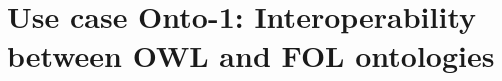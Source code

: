 \documentclass[10pt,%
\ifpretendfinal
final%
\else
draft%
\fi,
]{scrreprt}
\begin{document}
%
%
%
%
%
%

\section{Use case Onto-1: Interoperability between OWL and FOL ontologies}
\end{document}

